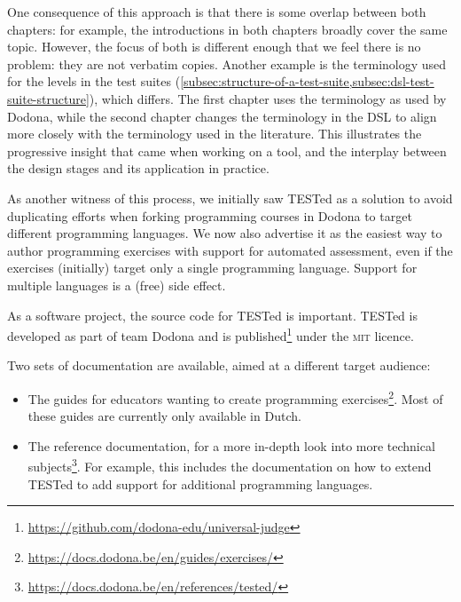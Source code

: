 \documentclass[./main]{subfiles}
\begin{document}
One consequence of this approach is that there is some overlap between both chapters: for example, the introductions in both chapters broadly cover the same topic.
However, the focus of both is different enough that we feel there is no problem: they are not verbatim copies.
Another example is the terminology used for the levels in the test suites (\cref{subsec:structure-of-a-test-suite,subsec:dsl-test-suite-structure}), which differs.
The first chapter uses the terminology as used by Dodona, while the second chapter changes the terminology in the DSL to align more closely with the terminology used in the literature.
This illustrates the progressive insight that came when working on a tool, and the interplay between the design stages and its application in practice.

As another witness of this process, we initially saw TESTed as a solution to avoid duplicating efforts when forking programming courses in Dodona to target different programming languages.
We now also advertise it as the easiest way to author programming exercises with support for automated assessment, even if the exercises (initially) target only a single programming language.
Support for multiple languages is a (free) side effect.

As a software project, the source code for TESTed is important.
TESTed is developed as part of team Dodona and is published\footnote{\url{https://github.com/dodona-edu/universal-judge}} under the \textsc{mit} licence.

Two sets of documentation are available, aimed at a different target audience:

\begin{itemize}
    \item The guides for educators wanting to create programming exercises\footnote{\url{https://docs.dodona.be/en/guides/exercises/}}.
          Most of these guides are currently only available in Dutch.
    \item The reference documentation, for a more in-depth look into more technical subjects\footnote{\url{https://docs.dodona.be/en/references/tested/}}.
          For example, this includes the documentation on how to extend TESTed to add support for additional programming languages.
\end{itemize}
\end{document}
